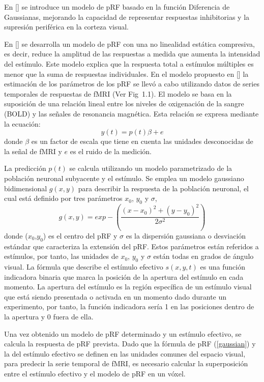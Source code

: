En [\cite{zuiderbaan_modeling_2012}] se introduce un modelo de pRF basado en la función Diferencia de Gaussianas, mejorando la capacidad de representar respuestas inhibitorias y la supresión periférica en la corteza visual.

En [\cite{kay_compressive_2013}] se desarrolla un modelo de pRF con una no linealidad estática compresiva, es decir, reduce la amplitud de las respuestas a medida que aumenta la intensidad del estímulo. Este modelo explica que la respuesta total a estímulos múltiples es menor que la suma de respuestas individuales. En el modelo propuesto en [\cite{dumoulin_population_2008}] la estimación de los parámetros de los pRF se llevó a cabo utilizando datos de series temporales de respuestas de fMRI (Ver Fig 1.1). El modelo se basa en la suposición de una relación lineal entre los niveles de oxigenación de la sangre (BOLD) y las señales de resonancia magnética. Esta relación se expresa mediante la ecuación:
\begin{equation}
	y(t)=p(t)\beta + e
\end{equation}
donde $\beta$ es un factor de escala que tiene en cuenta las unidades desconocidas de la señal de fMRI y $e$ es el ruido de la medición. 

La predicción $p(t)$ se calcula utilizando un modelo parametrizado de la población neuronal subyacente y el estímulo. Se emplea un modelo gaussiano bidimensional $g(x,y)$ para describir la respuesta de la población neuronal, el cual est\'a definido por tres par\'ametros $x_0$,  $y_0$ y $\sigma$,
\begin{equation}
	g(x,y)=exp-(\frac{(x-x_0)^2+(y-y_0)^2}{2\sigma^2})
	\label{gaussian}
\end{equation}
donde ($x_0$,$y_0$) es el centro del pRF y $\sigma$ es la dispersión gaussiana o desviación estándar que caracteriza la extensi\'on del pRF. Estos parámetros están referidos a estímulos, por tanto, las unidades de $x_0$, $y_0$ y $\sigma$ están todas en grados de ángulo visual. La fórmula que describe el estímulo efectivo $s(x,y,t)$ es una función indicadora binaria que marca la posición de la apertura del estímulo en cada momento. La apertura del est\'imulo es la región específica de un estímulo visual que está siendo presentada o activada en un momento dado durante un experimento, por tanto, la función indicadora ser\'ia 1 en las posiciones dentro de la apertura y 0 fuera de ella.

Una vez obtenido un modelo de pRF determinado y un estímulo efectivo, se calcula la respuesta de pRF prevista. Dado que la fórmula de pRF (\ref{gaussian}) y la del estímulo efectivo se definen en las unidades comunes del espacio visual, para predecir la serie temporal de fMRI, es necesario calcular la superposición entre el estímulo efectivo y el modelo de pRF en un vóxel.

